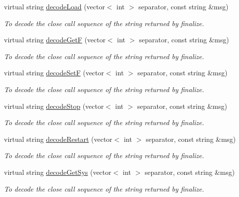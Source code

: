 \begin{DoxyCompactItemize}
virtual string \hyperlink{classIMSMapper_abe6d2e3537b551aa184b657a349d8cb2}{decodeLoad} (vector$<$ int $>$ separator, const string \&msg)
\begin{DoxyCompactList}\small\item\em To decode the close call sequence of the string returned by finalize. \item\end{DoxyCompactList}\item 
virtual string \hyperlink{classIMSMapper_a1481e2aec04b986736f769c364659eda}{decodeGetF} (vector$<$ int $>$ separator, const string \&msg)
\begin{DoxyCompactList}\small\item\em To decode the close call sequence of the string returned by finalize. \item\end{DoxyCompactList}\item 
virtual string \hyperlink{classIMSMapper_a87c4a9459c2823a089cc338c347ad4f6}{decodeSetF} (vector$<$ int $>$ separator, const string \&msg)
\begin{DoxyCompactList}\small\item\em To decode the close call sequence of the string returned by finalize. \item\end{DoxyCompactList}\item 
virtual string \hyperlink{classIMSMapper_a71be80fb21c0fe3cde1064d8379a0a67}{decodeStop} (vector$<$ int $>$ separator, const string \&msg)
\begin{DoxyCompactList}\small\item\em To decode the close call sequence of the string returned by finalize. \item\end{DoxyCompactList}\item 
virtual string \hyperlink{classIMSMapper_a949ccf0f3c1b9fcc93d0a3a444304ba0}{decodeRestart} (vector$<$ int $>$ separator, const string \&msg)
\begin{DoxyCompactList}\small\item\em To decode the close call sequence of the string returned by finalize. \item\end{DoxyCompactList}\item 
virtual string \hyperlink{classIMSMapper_acda01f83bdbd18fba9c99bba7fa538e7}{decodeGetSys} (vector$<$ int $>$ separator, const string \&msg)
\begin{DoxyCompactList}\small\item\em To decode the close call sequence of the string returned by finalize. \item\end{DoxyCompactList}\end{DoxyCompactItemize}


